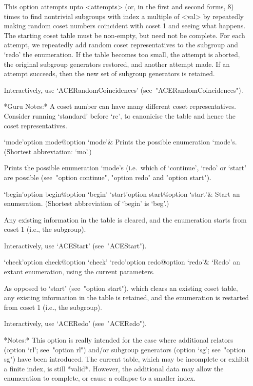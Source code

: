 This option attempts upto <attempts> (or,  in  the  first  and  second
forms, 8) times to find nontrivial subgroups with index a multiple  of
<val> by repeatedly making random coset numbers coincident with  coset
1 and seeing what happens. The starting coset table must be non-empty,
but need not be complete. For each attempt, we repeatedly  add  random
coset representatives to the subgroup and `redo' the  enumeration.  If
the table becomes too small, the  attempt  is  aborted,  the  original
subgroup generators restored, and another attempt made. If an  attempt
succeeds, then the new set of subgroup generators is retained.

Interactively, use `ACERandomCoincidences' (see~"ACERandomCoincidences").

*Guru Notes:*
A coset number can have many different coset representatives. Consider
running `standard' before `rc', to canonicise the table and hence  the
coset representatives.

\enditems


\beginitems

\>`mode'{option mode}@{option `mode'}&
Prints the possible enumeration `mode's.
(Shortest abbreviation: `mo'.)

Prints the possible enumeration  `mode's  (i.e.~which  of  `continue',
`redo' or `start' are possible (see~"option continue",  "option  redo"
and "option start").

\>`begin'{option begin}@{option `begin'}
\>`start'{option start}@{option `start'}&
Start an enumeration. (Shortest abbreviation of `begin' is `beg'.)

Any existing information in the table is cleared, and the  enumeration
starts from coset 1 (i.e., the subgroup).

Interactively, use `ACEStart' (see~"ACEStart").

\>`check'{option check}@{option `check'}
\>`redo'{option redo}@{option `redo'}&
`Redo' an extant enumeration, using the current parameters.

As opposed to `start' (see~"option start"), which clears  an  existing
coset table, any existing information in the table  is  retained,  and
the enumeration is restarted from coset 1 (i.e., the subgroup).

Interactively, use `ACERedo' (see~"ACERedo").

*Notes:*
This option is really intended for the case where additional  relators
(option `rl'; see~"option  rl")  and/or  subgroup  generators  (option
`sg'; see~"option sg") have been introduced. The current table,  which
may be incomplete  or  exhibit  a  finite  index,  is  still  *valid*.
However, the additional data may allow the enumeration to complete, or
cause a collapse to a smaller index.


